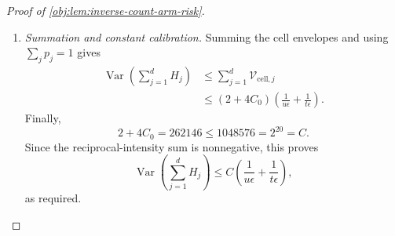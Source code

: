 \begin{proof}[Proof of \cref{obj:lem:inverse-count-arm-risk}]
\begin{enumerate}
Using \(q_{aj}\le s_{aj}\) in the first two bounds yields
\[
\begin{aligned}
q_{aj}\frac{\rho_j^2+\rho_j}{(1+\lambda_j)^2}
&\le
\frac{s_{aj}\rho_j^2}{(1+\lambda_j)^2}
+\frac{s_{aj}\rho_j}{(1+\lambda_j)^2}\\
&\le\frac{s_{1-a,j}^2}{s_{aj}}+s_{1-a,j}
\le\frac{2p_j}\epsilon.
\end{aligned}
\]
Similarly, \(q_{aj}^2\le s_{aj}^2\) and the last two bounds give
\[
\begin{aligned}
q_{aj}^2\left(
\frac{\rho_j}{(1+\lambda_j)^2}
+\frac{\rho_j^2\lambda_j}{(1+\lambda_j)^4}
\right)
&\le
\frac{s_{aj}^2\rho_j}{(1+\lambda_j)^2}
+\frac{s_{aj}^2\rho_j^2\lambda_j}{(1+\lambda_j)^4}\\
&\le\frac{s_{1-a,j}}t
+\frac{s_{1-a,j}^2}{t s_{aj}}
\le\frac{2p_j}{t\epsilon}.
\end{aligned}
\]
Substitution into the cell envelope proves
\[
\begin{aligned}
\mathcal V_{\mathrm{cell},j}
&\le
\frac2u\frac{p_j}\epsilon
+\frac{2C_0}u\frac{2p_j}\epsilon
+C_0\frac{2p_j}{t\epsilon}\\
&=(2+4C_0)\frac{p_j}{u\epsilon}
+2C_0\frac{p_j}{t\epsilon}\\
&\le
(2+4C_0)p_j
\left(\frac1{u\epsilon}+\frac1{t\epsilon}\right).
\end{aligned}
\]
The last inequality adds the nonnegative quantity
\((2+2C_0)p_j/(t\epsilon)\). Together with the zero-mass case, this
establishes the envelope for every cell.

\item \emph{Summation and constant calibration.}
Summing the cell envelopes and using \(\sum_jp_j=1\) gives
\[
\begin{aligned}
\operatorname{Var}\!\left(\sum_{j=1}^{d}H_j\right)
&\le\sum_{j=1}^{d}\mathcal V_{\mathrm{cell},j}\\
&\le(2+4C_0)
\left(\frac1{u\epsilon}+\frac1{t\epsilon}\right).
\end{aligned}
\]
Finally,
\[
2+4C_0=262146\le1048576=2^{20}=C.
\]
Since the reciprocal-intensity sum is nonnegative, this proves
\[
\operatorname{Var}\!\left(\sum_{j=1}^{d}H_j\right)
\le C\left(\frac1{u\epsilon}+\frac1{t\epsilon}\right),
\]
as required.
\end{enumerate}
\end{proof}
